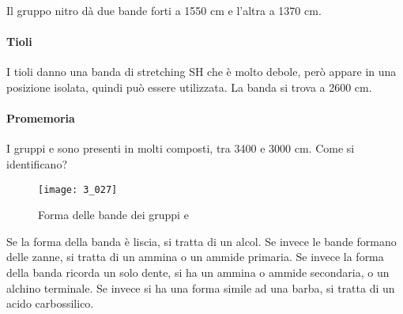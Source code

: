 Il gruppo nitro dà due bande forti a 1550 cm e l'altra a 1370 cm.

\paragraph{Tioli}

I tioli danno una banda di stretching SH che è molto debole, però appare
in una posizione isolata, quindi può essere utilizzata. La banda si
trova a 2600 cm.

\paragraph{Promemoria}
I gruppi  e  sono presenti in molti composti, tra 3400 e 3000 cm. Come
si identificano?

\begin{figure}[H]
    \texttt{[image: 3\_027]}
    \caption{Forma delle bande dei gruppi  e }
\end{figure}

Se la forma della banda è liscia, si tratta di un alcol. Se invece le
bande formano delle zanne, si tratta di un ammina o un ammide primaria.
Se invece la forma della banda ricorda un solo dente, si ha un ammina o
ammide secondaria, o un alchino terminale.
Se invece si ha una forma simile ad una barba, si tratta di un acido
carbossilico.

\vfill

\begingroup
\checkoddpage
{}
\endgroup

\vfill
